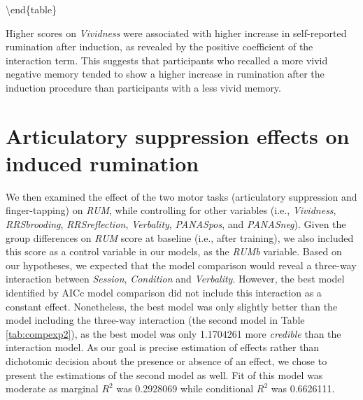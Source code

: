 \documentclass[12pt,]{book}
\begin{document}
\textbackslash{}end\{table\}

Higher scores on \emph{Vividness} were associated with higher increase
in self-reported rumination after induction, as revealed by the positive
coefficient of the interaction term. This suggests that participants who
recalled a more vivid negative memory tended to show a higher increase
in rumination after the induction procedure than participants with a
less vivid memory.

\section{Articulatory suppression effects on induced
rumination}\label{articulatory-suppression-effects-on-induced-rumination-1}

We then examined the effect of the two motor tasks (articulatory
suppression and finger-tapping) on \emph{RUM}, while controlling for
other variables (i.e., \emph{Vividness}, \emph{RRSbrooding},
\emph{RRSreflection}, \emph{Verbality}, \emph{PANASpos}, and
\emph{PANASneg}). Given the group differences on \emph{RUM} score at
baseline (i.e., after training), we also included this score as a
control variable in our models, as the \emph{RUMb} variable. Based on
our hypotheses, we expected that the model comparison would reveal a
three-way interaction between \emph{Session}, \emph{Condition} and
\emph{Verbality}. However, the best model identified by AICc model
comparison did not include this interaction as a constant effect.
Nonetheless, the best model was only slightly better than the model
including the three-way interaction (the second model in Table
\ref{tab:compexp2}), as the best model was only 1.1704261 more
\emph{credible} than the interaction model. As our goal is precise
estimation of effects rather than dichotomic decision about the presence
or absence of an effect, we chose to present the estimations of the
second model as well. Fit of this model was moderate as marginal
\(R^{2}\) was 0.2928069 while conditional \(R^{2}\) was 0.6626111.
\end{document}
